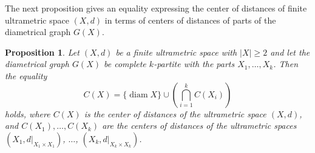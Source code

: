 \documentclass[pdflatex,sn-mathphys-num]{sn-jnl}%
\theoremstyle{thmstyleone}%
\newtheorem{Proposition}[Theorem]{Proposition}
\theoremstyle{thmstyletwo}%
\theoremstyle{thmstylethree}%
\theoremstyle{thmstyletwo}%
\theoremstyle{thmstylethree}%
\begin{document}
The next proposition gives an equality expressing the center of distances of  finite ultrametric space $(X,d)$ in terms of centers of distances  of parts of the diametrical graph $G(X)$.







\begin{Proposition}\label{suul}
Let $(X,d)$ be a finite ultrametric space with $|X|\geq 2$ and let the diametrical graph $G(X)$ be complete $k$-partite with the parts $X_1,\ldots,X_k$.
Then the equality
\begin{equation}
    \label{sam1}
C(X)=\{\operatorname{diam} X\}\cup\left(\bigcap_{i=1}^{k} C(X_i)\right)
\end{equation}
holds, where $C(X)$ is the center of distances of the ultrametric space $(X,d)$, and $C(X_1),\dots,C(X_k)$ are the centers of distances of the ultrametric spaces $(X_1,d|_{X_1 \times X_1})$, $\dots$, $(X_k,d|_{X_k \times X_k})$.
\end{Proposition}
\end{document}
